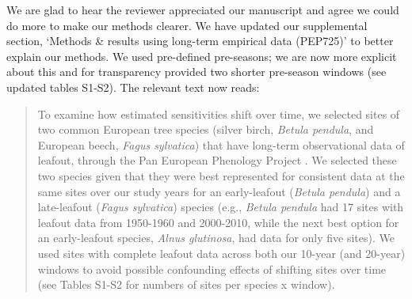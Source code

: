 \documentclass[11pt]{article}
\begin{document}
We are glad to hear the reviewer appreciated our manuscript and agree we could do more to make our methods clearer. We have updated our supplemental section, `Methods \& results using long-term empirical data (PEP725)' to better explain our methods. We used pre-defined pre-seasons; we are now more explicit about this and for transparency provided two shorter pre-season windows (see updated tables S1-S2). The relevant text now reads:
\begin{quote}
To examine how estimated sensitivities shift over time, we selected sites of two common European tree species (silver birch, \emph{Betula pendula}, and European beech, \emph{Fagus sylvatica}) that have long-term observational data of leafout, through the Pan European Phenology Project \citep[PEP725,][]{Templ2018}. We selected these two species given that they were best represented for consistent data at the same sites over our study years for an early-leafout (\emph{Betula pendula}) and a late-leafout (\emph{Fagus sylvatica}) species (e.g., \emph{Betula pendula} had 17 sites with leafout data from 1950-1960 and 2000-2010, while the next best option for an early-leafout species, \emph{Alnus glutinosa}, had data for only five sites). We used sites with complete leafout data across both our 10-year (and 20-year) windows to avoid possible confounding effects of shifting sites over time (see Tables S1-S2 for numbers of sites per species x window). \\


\end{quote}
\end{document}
